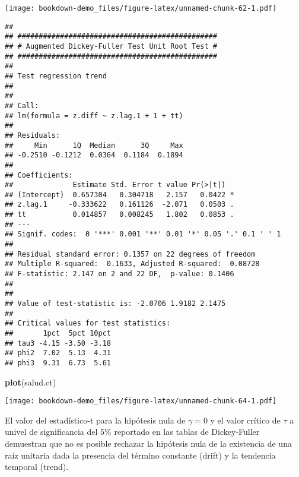 \documentclass[]{book}
\newenvironment{Shaded}{\begin{snugshade}}{\end{snugshade}}
\newcommand{\KeywordTok}[1]{\textcolor[rgb]{0.13,0.29,0.53}{\textbf{#1}}}
\newcommand{\DataTypeTok}[1]{\textcolor[rgb]{0.13,0.29,0.53}{#1}}
\newcommand{\DecValTok}[1]{\textcolor[rgb]{0.00,0.00,0.81}{#1}}
\newcommand{\StringTok}[1]{\textcolor[rgb]{0.31,0.60,0.02}{#1}}
\newcommand{\OperatorTok}[1]{\textcolor[rgb]{0.81,0.36,0.00}{\textbf{#1}}}
\newcommand{\NormalTok}[1]{#1}
\theoremstyle{definition}
\theoremstyle{definition}
\theoremstyle{definition}
\theoremstyle{remark}
\begin{document}
\texttt{[image: bookdown-demo\_files/figure-latex/unnamed-chunk-62-1.pdf]}

\begin{Shaded}
\end{Shaded}

\begin{verbatim}
## 
## ############################################### 
## # Augmented Dickey-Fuller Test Unit Root Test # 
## ############################################### 
## 
## Test regression trend 
## 
## 
## Call:
## lm(formula = z.diff ~ z.lag.1 + 1 + tt)
## 
## Residuals:
##     Min      1Q  Median      3Q     Max 
## -0.2510 -0.1212  0.0364  0.1184  0.1894 
## 
## Coefficients:
##              Estimate Std. Error t value Pr(>|t|)  
## (Intercept)  0.657304   0.304718   2.157   0.0422 *
## z.lag.1     -0.333622   0.161126  -2.071   0.0503 .
## tt           0.014857   0.008245   1.802   0.0853 .
## ---
## Signif. codes:  0 '***' 0.001 '**' 0.01 '*' 0.05 '.' 0.1 ' ' 1
## 
## Residual standard error: 0.1357 on 22 degrees of freedom
## Multiple R-squared:  0.1633, Adjusted R-squared:  0.08728 
## F-statistic: 2.147 on 2 and 22 DF,  p-value: 0.1406
## 
## 
## Value of test-statistic is: -2.0706 1.9182 2.1475 
## 
## Critical values for test statistics: 
##       1pct  5pct 10pct
## tau3 -4.15 -3.50 -3.18
## phi2  7.02  5.13  4.31
## phi3  9.31  6.73  5.61
\end{verbatim}

\begin{Shaded}
\begin{Highlighting}[]
\KeywordTok{plot}\NormalTok{(salud.ct)}
\end{Highlighting}
\end{Shaded}

\texttt{[image: bookdown-demo\_files/figure-latex/unnamed-chunk-64-1.pdf]}

El valor del estadístico-t para la hipótesis nula de \(\gamma=0\) y el
valor crítico de \(\tau\) a univel de significancia del 5\% reportado en
las tablas de Dickey-Fuller demuestran que no es posible rechazar la
hipótesis nula de la existencia de una raíz unitaria dada la presencia
del término constante (drift) y la tendencia temporal (trend).
\end{document}
